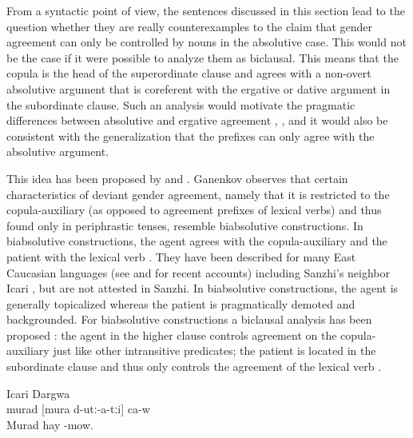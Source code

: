 From a syntactic point of view, the sentences discussed in this section lead to the question whether they are really counterexamples to the claim that gender agreement can only be controlled by nouns in the absolutive case. This would not be the case if it were possible to analyze them as biclausal. This means that the copula is the head of the superordinate clause and agrees with a non-overt absolutive argument that is coreferent with the ergative or dative argument in the subordinate clause. Such an analysis would motivate the pragmatic differences between absolutive and ergative agreement , , and it would also be consistent with the generalization that the prefixes can only agree with the absolutive argument. 

This idea has been proposed by \citet{Sumbatova2010} and \citet{GanenkovForthcoming}. Ganenkov observes that certain characteristics of deviant gender agreement, namely that it is restricted to the copula-auxiliary (as opposed to agreement prefixes of lexical verbs) and thus found only in periphrastic tenses, resemble biabsolutive constructions. In biabsolutive constructions, the agent agrees with the copula-auxiliary and the patient with the lexical verb . They have been described for many East Caucasian languages (see \citet{Forker2012a} and \citet{Gagliardietal.2014} for recent accounts) including Sanzhi's neighbor Icari \citet[156]{Sumbatova.Mutalov2003}, but are not attested in Sanzhi. In biabsolutive constructions, the agent is generally topicalized whereas the patient is pragmatically demoted and backgrounded. For biabsolutive constructions a biclausal analysis has been proposed \citep{Kazenin1998, Kazenin.Testelec1999, Kazenin2001}: the agent in the higher clause controls agreement on the copula-auxiliary just like other intransitive predicates; the patient is located in the subordinate clause and thus only controls the agreement of the lexical verb .

\begin{exe}
	\ex	Icari Dargwa \citep[156]{Sumbatova.Mutalov2003} \\\label{ex:As to Murad, he is mowing hay.}
	\gll	murad	[mura	d-utː-a-tːi]	ca-w\\
		Murad	hay	-mow.	\\
	\glt	{}
\end{exe}

